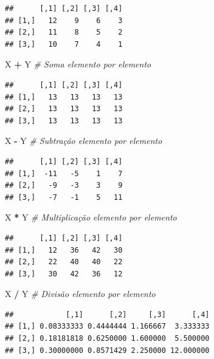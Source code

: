 \documentclass[
]{book}
\newenvironment{Shaded}{\begin{snugshade}}{\end{snugshade}}
\newcommand{\CommentTok}[1]{\textcolor[rgb]{0.56,0.35,0.01}{\textit{#1}}}
\newcommand{\NormalTok}[1]{#1}
\newcommand{\OperatorTok}[1]{\textcolor[rgb]{0.81,0.36,0.00}{\textbf{#1}}}
\newcommand{\StringTok}[1]{\textcolor[rgb]{0.31,0.60,0.02}{#1}}
\theoremstyle{definition}
\theoremstyle{definition}
\theoremstyle{definition}
\theoremstyle{remark}
\begin{document}
\begin{verbatim}
##      [,1] [,2] [,3] [,4]
## [1,]   12    9    6    3
## [2,]   11    8    5    2
## [3,]   10    7    4    1
\end{verbatim}

\begin{Shaded}
\begin{Highlighting}[]
\NormalTok{X }\OperatorTok{+}\StringTok{ }\NormalTok{Y   }\CommentTok{# Soma elemento por elemento}
\end{Highlighting}
\end{Shaded}

\begin{verbatim}
##      [,1] [,2] [,3] [,4]
## [1,]   13   13   13   13
## [2,]   13   13   13   13
## [3,]   13   13   13   13
\end{verbatim}

\begin{Shaded}
\begin{Highlighting}[]
\NormalTok{X }\OperatorTok{-}\StringTok{ }\NormalTok{Y   }\CommentTok{# Subtração elemento por elemento}
\end{Highlighting}
\end{Shaded}

\begin{verbatim}
##      [,1] [,2] [,3] [,4]
## [1,]  -11   -5    1    7
## [2,]   -9   -3    3    9
## [3,]   -7   -1    5   11
\end{verbatim}

\begin{Shaded}
\begin{Highlighting}[]
\NormalTok{X }\OperatorTok{*}\StringTok{ }\NormalTok{Y   }\CommentTok{# Multiplicação elemento por elemento}
\end{Highlighting}
\end{Shaded}

\begin{verbatim}
##      [,1] [,2] [,3] [,4]
## [1,]   12   36   42   30
## [2,]   22   40   40   22
## [3,]   30   42   36   12
\end{verbatim}

\begin{Shaded}
\begin{Highlighting}[]
\NormalTok{X }\OperatorTok{/}\StringTok{ }\NormalTok{Y   }\CommentTok{# Divisão elemento por elemento}
\end{Highlighting}
\end{Shaded}

\begin{verbatim}
##            [,1]      [,2]     [,3]      [,4]
## [1,] 0.08333333 0.4444444 1.166667  3.333333
## [2,] 0.18181818 0.6250000 1.600000  5.500000
## [3,] 0.30000000 0.8571429 2.250000 12.000000
\end{verbatim}
\end{document}
